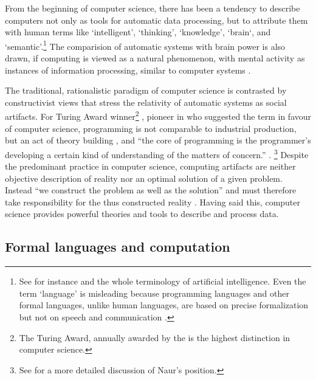 From the beginning of computer science, there has been a tendency to 
describe computers not only as tools for automatic data processing, but to 
attribute them with human terms like `intelligent', `thinking', `knowledge', 
`brain`, and `semantic'.\footnote{See for instance \textcite{Berkeley1949} 
and the whole terminology of artificial intelligence. Even the term `language'
is misleading because programming languages and other formal languages,
unlike human languages, are based on precise formalization but not on speech
and communication \cite{Naur1992}.} %
The comparision of automatic systems with brain power is also drawn, if 
computing is viewed as a natural phenomenon, with mental activity as
instances of information processing, similar to computer systems 
\cite{Denning2007}.

The traditional, rationalistic paradigm of computer science is contrasted
by constructivist views that stress the relativity of automatic systems
as social artifacts. For Turing Award winner\footnote{The Turing Award, 
annually awarded by the  is the highest distinction in computer
science.} , pioneer in  who 
suggested the term  in favour of computer science, programming
is not comparable to industrial production, but an act of theory building 
\cite{Naur1985}, and ``the core of programming is the programmer's developing
a certain kind of understanding of the matters of concern.'' \cite{Naur2007}.%
\footnote{See \textcite{Wyssusek2007} for a more detailed discussion of Naur's
position.} Despite the predominant practice in computer science, computing 
artifacts are neither objective description of reality \cite{Kent1978} nor
an optimal solution of a given problem. Instead ``we construct the problem 
as well as the solution'' \cite{Floyd1996} and must therefore take 
responsibility for the thus constructed reality \cite{Weizenbaum1976}.
Having said this, computer science provides powerful theories and tools
to describe and process data.

\subsection{Formal languages and computation}
\label{sec:formallanguages}

